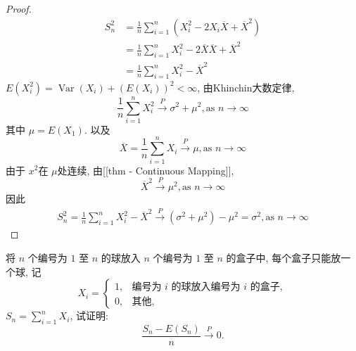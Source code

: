 \documentclass[../main.tex]{subfiles}
\begin{document}
\begin{proof}
 $$ \begin{aligned} S_{n}^{2}&= \frac{1 }{n }\sum _{i= 1}^{n}\left(X_{i}^{2}-2X_{i}    \overline{X}+  \overline{X}^{2}\right)\\&= \frac{1 }{n }\sum _{i= 1}^{n}X_{i}^{2}- 2  \overline{X}  \overline{X}+   \overline{X}^{2}\\&= \frac{1 }{n }\sum _{i= 1}^{n}X_{i}^{2}-   \overline{X}^{2} \end{aligned} $$ 
$E\left(X_{i}^{2}\right)= \operatorname{Var}\left(X_{i}\right)+\left(E\left(X_{i}\right)\right)^{2}< \infty$, 由Khinchin大数定律,
 $$ \frac{1 }{n }\sum _{i= 1}^{n}X_{i}^{2} \xrightarrow{P} \sigma ^{2}+ \mu ^{2},\text{as }n\to \infty $$
其中 $\mu = E\left(X_{1}\right)$. 以及 
 $$ \overline{X}= \frac{1 }{n }\sum _{i= 1}^{n}X_{i}\xrightarrow{P}  \mu ,\text{as }n\to \infty $$ 
由于 $x^{2}$在 $\mu$处连续, 由[[thm - Continuous Mapping]],  
 $$ \overline{X}^{2}\xrightarrow{P} \mu ^{2},\text{as }n\to  \infty  $$ 
因此 
 $$ \begin{aligned} S_{n}^{2}= \frac{1 }{n }\sum _{i= 1}^{n}X_{i}^{2}- \overline{X}^{2}\xrightarrow{P}\left(\sigma ^{2}+ \mu ^{2}\right)-\mu ^{2}= \sigma ^{2},\text{as }n \to \infty \end{aligned} $$ 
\end{proof}
\begin{exercise}{}{}
将 $n$ 个编号为 $1$ 至 $n$ 的球放入 $n$ 个编号为 $1$ 至 $n$ 的盒子中, 每个盒子只能放一个球, 记
$$
X_i = \begin{cases} 1, & \text{编号为 } i \text{ 的球放入编号为 } i \text{ 的盒子}, \\ 0, & \text{其他}, \end{cases}
$$
$S_n = \sum_{i=1}^n X_i$, 试证明:
$$
\frac{S_n - E(S_n)}{n} \xrightarrow{P} 0.
$$
\end{exercise}
\end{document}
